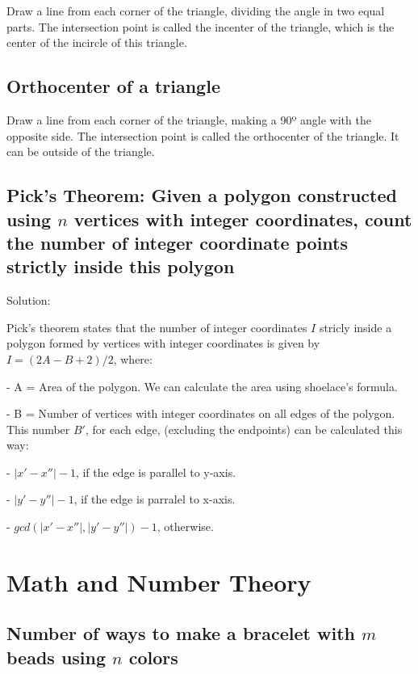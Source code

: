 \documentclass[12pt]{article}%
\begin{document}
Draw a line from each corner of the triangle, dividing the angle in two equal parts. The intersection point is called the incenter of the triangle, which is the center of the incircle of this triangle.

\subsection{Orthocenter of a triangle}

Draw a line from each corner of the triangle, making a 90º angle with the opposite side. The intersection point is called the orthocenter of the triangle. It can be outside of the triangle.

\subsection{Pick's Theorem: Given a polygon constructed using $n$ vertices with integer coordinates, count the number of integer coordinate points strictly inside this polygon}

Solution:

Pick's theorem states that the number of integer coordinates $I$ stricly inside a polygon formed by vertices with integer coordinates is given by $I = (2A - B + 2)/2$, where:

- A = Area of the polygon. We can calculate the area using shoelace's formula.

- B = Number of vertices with integer coordinates on all edges of the polygon. This number $B'$, for each edge, (excluding the endpoints) can be calculated this way: 

\hspace{2mm} - $|x' - x''| - 1$, if the edge is parallel to y-axis.
    
\hspace{2mm} - $|y' - y''| - 1$, if the edge is parralel to x-axis.
    
\hspace{2mm} - $gcd(|x' - x''|, |y' - y''|) - 1$, otherwise.
 
\section{Math and Number Theory}

\subsection{Number of ways to make a bracelet with $m$ beads using $n$ colors}
\end{document}

